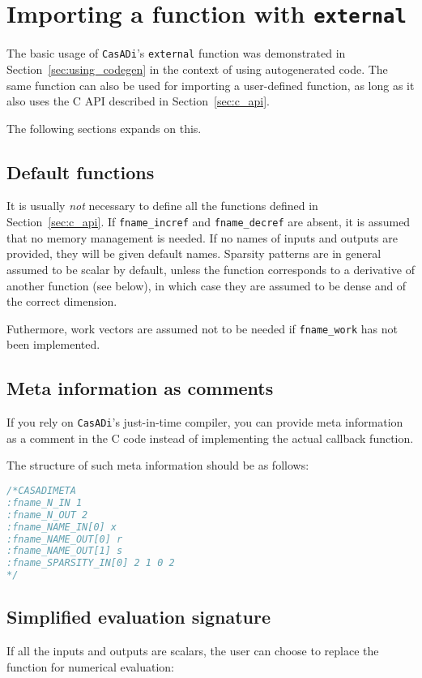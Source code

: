 \documentclass[a4paper,12pt]{book}
\newcommand{\CasADi}{\texttt{CasADi}\xspace}
\begin{document}
\section{Importing a function with \texttt{external}} \label{sec:external}
The basic usage of \CasADi's \texttt{external} function was demonstrated in
Section~\ref{sec:using_codegen} in the context of using autogenerated code. The
same function can also be used for importing a user-defined function, as long as
it also uses the C API described in Section~\ref{sec:c_api}.

The following sections expands on this.

\subsection*{Default functions}
It is usually \emph{not} necessary to define all the functions defined in
Section~\ref{sec:c_api}. If \verb|fname_incref| and \verb|fname_decref|
are absent, it is assumed that no memory management is needed. If no
names of inputs and outputs are provided, they will be given default names.
Sparsity patterns are in general assumed to be scalar by default, unless the
function corresponds to a derivative of another function (see below), in which
case they are assumed to be dense and of the correct dimension.

Futhermore, work vectors are assumed not to be needed if \verb|fname_work| has
not been implemented.

\subsection*{Meta information as comments}
If you rely on \CasADi's just-in-time compiler, you can provide meta information
as a comment in the C code instead of implementing the actual callback function.

The structure of such meta information should be as follows:
\begin{lstlisting}[language=C]
/*CASADIMETA
:fname_N_IN 1
:fname_N_OUT 2
:fname_NAME_IN[0] x
:fname_NAME_OUT[0] r
:fname_NAME_OUT[1] s
:fname_SPARSITY_IN[0] 2 1 0 2
*/
\end{lstlisting}

\subsection*{Simplified evaluation signature}
If all the inputs and outputs are scalars, the user can choose to replace the
function for numerical evaluation:
\end{document}
